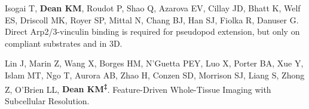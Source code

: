 \begin{etaremune}

\item Isogai T, \textbf{Dean KM}, Roudot P, Shao Q, Azarova EV, Cillay JD, Bhatt K, Welf ES, Driscoll MK, Royer SP, Mittal N, Chang BJ, Han SJ, Fiolka R, Danuser G. Direct Arp2/3-vinculin binding is required for pseudopod extension, but only on compliant substrates and in 3D. 

\item Lin J, Marin Z, Wang X, Borges HM, N’Guetta PEY, Luo X, Porter BA, Xue Y, Islam MT, Ngo T, Aurora AB, Zhao H, Conzen SD, Morrison SJ, Liang S, Zhong Z, O’Brien LL, \textbf{Dean KM\textsuperscript{‡}}. Feature-Driven Whole-Tissue Imaging with Subcellular Resolution. 

\end{etaremune}